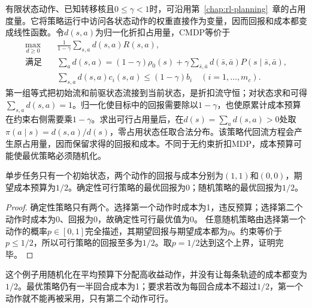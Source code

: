 有限状态动作、已知转移核且$0\leq\gamma<1$时，可沿用第~\ref{chap:rl-planning}~章的占用度量。它将策略运行中访问各状态动作的权重直接作为变量，因而回报和成本都变成线性函数。令$d(s,a)$为归一化折扣占用量，CMDP等价于
\begin{align}
  \max_{d\geq0}\quad&
       \frac{1}{1-\gamma}\sum_{s,a}d(s,a)R(s,a), \nonumber\\
  \text{满足}\quad&
       \sum_a d(s,a)
       =(1-\gamma)\rho_0(s)
          +\gamma\sum_{\bar s,\bar a}d(\bar s,\bar a)
                   P(s\mid\bar s,\bar a), \nonumber\\
  &\sum_{s,a}d(s,a)c_i(s,a)\leq(1-\gamma)b_i
       \quad (i=1,\ldots,m_c).
  \label{eq:rl-trustworthy-cmdp-lp}
\end{align}
第一组等式把初始流和前驱状态流接到当前状态，是折扣流守恒；对状态求和可得$\sum_{s,a}d(s,a)=1$。归一化使目标中的回报需要除以$1-\gamma$，也使原累计成本预算在约束右侧需要乘$1-\gamma$。求出可行占用量后，在$d(s)=\sum_a d(s,a)>0$处取
$\pi(a\mid s)=d(s,a)/d(s)$，零占用状态任取合法分布。该策略代回流方程会产生原占用量，因而保留求得的回报和成本。不同于无约束折扣MDP，成本预算可能使最优策略必须随机化。

\begin{theorem}[约束最优可能需要随机化]
  \label{thm:rl-trustworthy-randomization}
  单步任务只有一个初始状态，两个动作的回报与成本分别为$(1,1)$和$(0,0)$，期望成本预算为$1/2$。确定性可行策略的最优回报为0；随机策略的最优回报为$1/2$。
\end{theorem}
\begin{proof}
  确定性策略只有两个。选择第一个动作时成本为1，违反预算；选择第二个动作时成本为0、回报为0，故确定性可行最优值为0。
  任意随机策略由选择第一个动作的概率$p\in[0,1]$完全描述，其期望回报与期望成本都为$p$。约束等价于$p\leq1/2$，所以可行策略的回报至多为$1/2$。取$p=1/2$达到这个上界，证明完毕。
\end{proof}

这个例子用随机化在平均预算下分配高收益动作，并没有让每条轨迹的成本都变为$1/2$。最优策略仍有一半回合成本为1；要求若改为每回合成本不超过$1/2$，第一个动作就不能再被采用，只有第二个动作可行。

